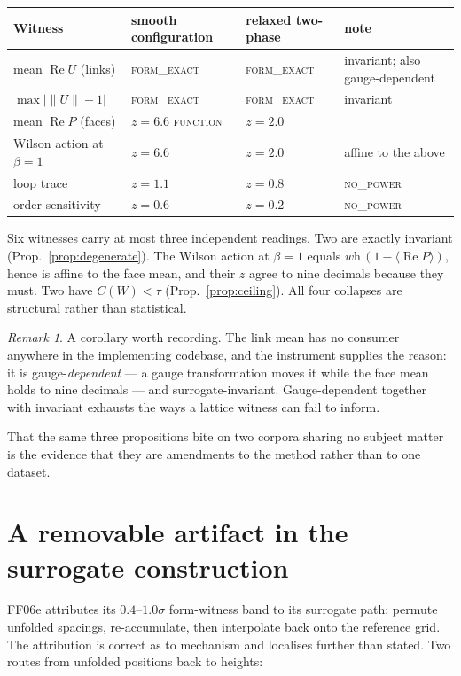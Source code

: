 \documentclass[11pt]{article}
\theoremstyle{remark}
\newtheorem{remark}{Remark}
\newcommand{\tier}[1]{\textsc{#1}}
\begin{document}
\begin{center}\small
\begin{tabular}{llll}
\toprule
Witness & smooth configuration & relaxed two-phase & note \\
\midrule
mean $\operatorname{Re}U$ (links) & \tier{form\_exact} & \tier{form\_exact} & invariant; also gauge-dependent \\
$\max|\|U\|-1|$ & \tier{form\_exact} & \tier{form\_exact} & invariant \\
mean $\operatorname{Re}P$ (faces) & $z=6.6$ \tier{function} & $z=2.0$ & \\
Wilson action at $\beta=1$ & $z=6.6$ & $z=2.0$ & affine to the above \\
loop trace & $z=1.1$ & $z=0.8$ & \tier{no\_power} \\
order sensitivity & $z=0.6$ & $z=0.2$ & \tier{no\_power} \\
\bottomrule
\end{tabular}
\end{center}

Six witnesses carry at most three independent readings. Two are exactly invariant
(Prop.~\ref{prop:degenerate}). The Wilson action at $\beta=1$ equals
$\textit{wh}\,(1-\langle\operatorname{Re}P\rangle)$, hence is affine to the face mean, and
their $z$ agree to nine decimals because they must. Two have $C(W)<\tau$
(Prop.~\ref{prop:ceiling}). All four collapses are structural rather than statistical.

\begin{remark}
A corollary worth recording. The link mean has no consumer anywhere in the implementing
codebase, and the instrument supplies the reason: it is gauge-\emph{dependent} --- a gauge
transformation moves it while the face mean holds to nine decimals --- and
surrogate-invariant. Gauge-dependent together with invariant exhausts the ways a lattice
witness can fail to inform.
\end{remark}

That the same three propositions bite on two corpora sharing no subject matter is the
evidence that they are amendments to the method rather than to one dataset.

\section{A removable artifact in the surrogate construction}\label{sec:artifact}

FF06e attributes its $0.4$--$1.0\sigma$ form-witness band to its surrogate path: permute
unfolded spacings, re-accumulate, then interpolate back onto the reference grid. The
attribution is correct as to mechanism and localises further than stated. Two routes from
unfolded positions back to heights:
\end{document}
